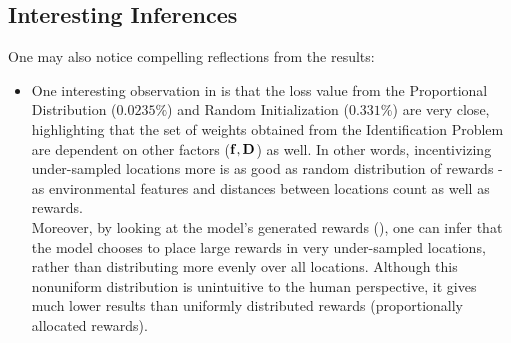 \subsection{Interesting Inferences}
One may also notice compelling reflections from the results:
\begin{itemize}
    \item One interesting observation in  is that the loss value from the Proportional Distribution ($0.0235\%$) and Random Initialization ($0.331\%$) are very close, highlighting that the set of weights obtained from the Identification Problem are dependent on other factors ($\mathbf{f}, \mathbf{D}$) as well. In other words, incentivizing under-sampled locations more is as good as random distribution of rewards - as environmental features and distances between locations count as well as rewards.\\
    Moreover, by looking at the model's generated rewards (), one can infer that the model chooses to place large rewards in very under-sampled locations, rather than distributing more evenly over all locations. Although this nonuniform distribution is unintuitive to the human perspective, it gives much lower results than uniformly distributed rewards (proportionally allocated rewards).
\end{itemize}
